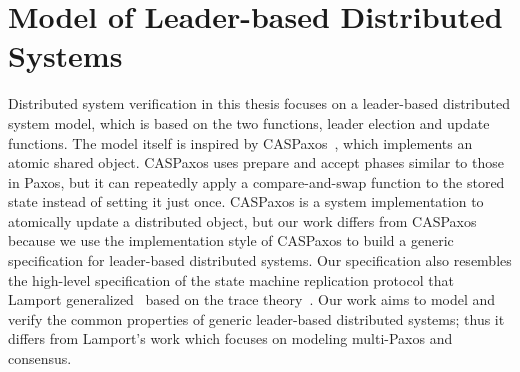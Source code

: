 \section{Model of Leader-based Distributed Systems}
\label{chatper:related:sec:model-of-leader-based-distributed-systems}

Distributed system verification in this thesis focuses on a leader-based distributed system model, 
which is based on the two functions,
leader election and update functions. 
The model itself is inspired by CASPaxos~\cite{caspaxos},
which implements an atomic shared object. 
CASPaxos uses prepare and accept
phases similar to those in Paxos, but it can repeatedly apply a compare-and-swap
function to the stored state instead of setting it just once. 
CASPaxos is a system implementation
to atomically update a distributed object, but our work differs from CASPaxos 
because we use the implementation style of
CASPaxos to build a generic specification for leader-based distributed systems.
Our specification also resembles the high-level specification of the state machine
replication protocol that  Lamport generalized~\cite{generalizedconsensus} based on the trace theory~\cite{mazurkiewicz:tracetheory}.
Our work aims to model and verify the common properties of  generic leader-based distributed systems;
thus it differs from Lamport's work which focuses on modeling multi-Paxos and consensus.

